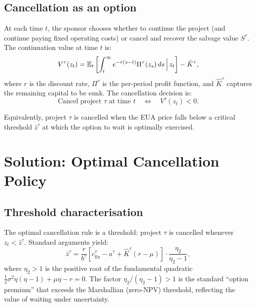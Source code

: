 \subsection{Cancellation as an option}

At each time $t$, the sponsor chooses whether to continue the project (and continue paying fixed operating costs) or cancel and recover the salvage value $S^{\tau}$. The continuation value at time $t$ is:
\begin{equation}
V^{\tau}(z_t) = \mathbb{E}_t \left[ \int_t^{\infty} e^{-r(s-t)} \Pi^{\tau}(z_s) \, ds \, \Big| \, z_t \right] - \hat{K}^{\tau},
\end{equation}
where $r$ is the discount rate, $\Pi^{\tau}$ is the per-period profit function, and $\hat{K}^{\tau}$ captures the remaining capital to be sunk. The cancellation decision is:
\begin{equation}
\text{Cancel project } \tau \text{ at time } t \quad \iff \quad V^{\tau}(z_t) < 0.
\end{equation}

Equivalently, project $\tau$ is cancelled when the EUA price falls below a critical threshold $\bar{z}^{\tau}$ at which the option to wait is optimally exercised.

\section{Solution: Optimal Cancellation Policy}
\label{sec:ch3-solution}

\subsection{Threshold characterisation}

The optimal cancellation rule is a threshold: project $\tau$ is cancelled whenever $z_t < \bar{z}^{\tau}$. Standard arguments \cite{dixit1994investment} yield:
\begin{equation}
\bar{z}^{\tau} = \frac{r}{b^{\tau}} \left[ c^{\tau}_{\mathrm{fix}} - a^{\tau} + \hat{K}^{\tau} (r - \mu) \right] \cdot \frac{\eta_2}{\eta_2 - 1},
\label{eq:ch3-threshold}
\end{equation}
where $\eta_2 > 1$ is the positive root of the fundamental quadratic $\frac{1}{2}\sigma^2 \eta(\eta-1) + \mu \eta - r = 0$. The factor $\eta_2 / (\eta_2 - 1) > 1$ is the standard ``option premium'' that exceeds the Marshallian (zero-NPV) threshold, reflecting the value of waiting under uncertainty.

